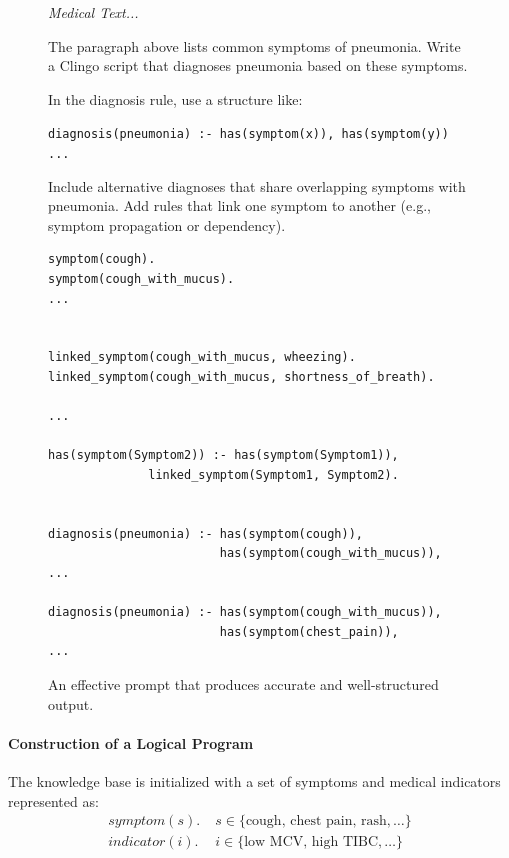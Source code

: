 \documentclass[10pt,leqno]{amsart}
\newcommand{\src}[1]{\texttt{#1}}
\newenvironment{commandline}{
	\medskip
	\begin{mdframed}[style=commandline]
}{
	\end{mdframed}
	\medskip
}
\newenvironment{prompt}[1][Prompt:]{ %
	\medskip
	\begin{mdframed}[style=warning]
		\noindent{\textbf{#1}}
}{
	\end{mdframed}
}
\begin{document}
\begin{figure}[!h]
\begin{prompt}
\textit{Medical Text...}

The paragraph above lists common symptoms of pneumonia.
Write a Clingo script that diagnoses pneumonia based on these symptoms.

In the diagnosis rule, use a structure like:

\src{diagnosis(pneumonia) :- has(symptom(x)), has(symptom(y)) ...}

Include alternative diagnoses that share overlapping symptoms with pneumonia.
Add rules that link one symptom to another (e.g., symptom propagation or dependency).

\end{prompt}


\begin{commandline}
\scriptsize
\begin{verbatim}
symptom(cough).
symptom(cough_with_mucus).
...


linked_symptom(cough_with_mucus, wheezing).
linked_symptom(cough_with_mucus, shortness_of_breath).

...

has(symptom(Symptom2)) :- has(symptom(Symptom1)), 
              linked_symptom(Symptom1, Symptom2).


diagnosis(pneumonia) :- has(symptom(cough)),
                        has(symptom(cough_with_mucus)),
...

diagnosis(pneumonia) :- has(symptom(cough_with_mucus)),
                        has(symptom(chest_pain)),
...
\end{verbatim}
\end{commandline}
\caption{An effective prompt that produces accurate and well-structured output.}
\label{fig:good-prompt}
\end{figure}

\paragraph{\textbf{Construction of a Logical Program}}

The knowledge base is initialized with a set of symptoms and medical indicators represented as:
\begin{align}
    symptom(s). & \; s \in \{ \text{cough, chest pain, rash}, \dots \} \\
    indicator(i). & \; i \in \{ \text{low MCV, high TIBC}, \dots \}
\end{align}
\end{document}

